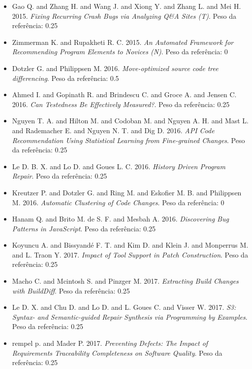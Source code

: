 \begin{itemize}
\item Gao Q. and Zhang H. and Wang J. and Xiong Y. and Zhang L. and Mei H.
      2015.
      {\it Fixing Recurring Crash Bugs via Analyzing Q\&A Sites (T)}.
      Peso da referência: 0.25
\item Zimmerman K. and Rupakheti R. C.
      2015.
      {\it An Automated Framework for Recommending Program Elements to Novices (N)}.
      Peso da referência: 0
\item Dotzler G. and Philippsen M.
      2016.
      {\it Move-optimized source code tree differencing}.
      Peso da referência: 0.5
\item Ahmed I. and Gopinath R. and Brindescu C. and Groce A. and Jensen C.
      2016.
      {\it Can Testedness Be Effectively Measured?}.
      Peso da referência: 0.25
\item Nguyen T. A. and Hilton M. and Codoban M. and Nguyen A. H. and Mast L. and Rademacher E. and Nguyen N. T. and Dig D.
      2016.
      {\it API Code Recommendation Using Statistical Learning from Fine-grained Changes}.
      Peso da referência: 0.25
\item Le D. B. X. and Lo D. and Goues L. C.
      2016.
      {\it History Driven Program Repair}.
      Peso da referência: 0.25
\item Kreutzer P. and Dotzler G. and Ring M. and Eskofier M. B. and Philippsen M.
      2016.
      {\it Automatic Clustering of Code Changes}.
      Peso da referência: 0
\item Hanam Q. and Brito M. de S. F. and Mesbah A.
      2016.
      {\it Discovering Bug Patterns in JavaScript}.
      Peso da referência: 0.25
\item Koyuncu A. and Bissyand{\'e} F. T. and Kim D. and Klein J. and Monperrus M. and L. Traon Y.
      2017.
      {\it Impact of Tool Support in Patch Construction}.
      Peso da referência: 0.25
\item Macho C. and Mcintosh S. and Pinzger M.
      2017.
      {\it Extracting Build Changes with BuildDiff}.
      Peso da referência: 0.25
\item Le D. X. and Chu D. and Lo D. and L. Goues C. and Visser W.
      2017.
      {\it S3: Syntax- and Semantic-guided Repair Synthesis via Programming by Examples}.
      Peso da referência: 0.25
\item rempel p. and Mader P.
      2017.
      {\it Preventing Defects: The Impact of Requirements Traceability Completeness on Software Quality}.
      Peso da referência: 0.25

\end{itemize}
